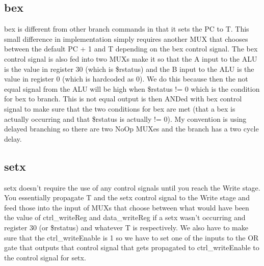 \documentclass[letterpaper]{article} %
\begin{document}
    \subsection{bex}
        bex is different from other branch commands in that it sets the PC to T. This small difference in implementation simply requires another MUX that chooses between the default PC + 1 and T depending on the bex control signal. The bex control signal is also fed into two MUXs make it so that the A input to the ALU is the value in register 30 (which is \$rstatus) and the B input to the ALU is the value in register 0 (which is hardcoded as 0). We do this because then the not equal signal from the ALU will be high when \$rstatus != 0 which is the condition for bex to branch. This is not equal output is then ANDed with bex control signal to make sure that the two conditions for bex are met (that a bex is actually occurring and that \$rstatus is actually != 0). My convention is using delayed branching so there are two NoOp MUXes and the branch has a two cycle delay.
    
    \subsection{setx}
        setx doesn't require the use of any control signals until you reach the Write stage. You essentially propagate T and the setx control signal to the Write stage and feed those into the input of MUXs that choose between what would have been the value of ctrl\_writeReg and data\_writeReg if a setx wasn't occurring and register 30 (or \$rstatus) and whatever T is respectively. We also have to make sure that the ctrl\_writeEnable is 1 so we have to set one of the inputs to the OR gate that outputs that control signal that gets propagated to ctrl\_writeEnable to the control signal for setx. 
\end{document}
